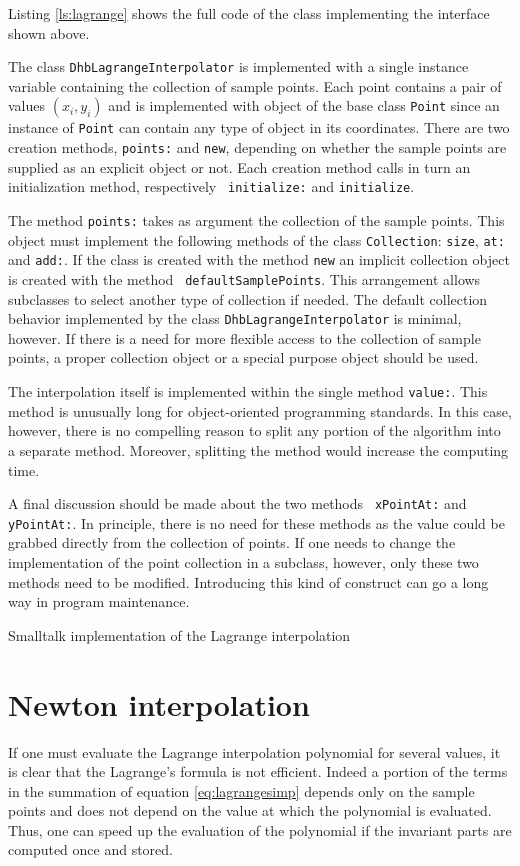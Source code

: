 \documentclass[twoside]{book}
\begin{document}
Listing \ref{ls:lagrange} shows the full code of the class
implementing the interface shown above.

The class {\tt DhbLagrangeInterpolator} is implemented with a
single instance variable containing the collection of sample
points. Each point contains a pair of values
$\left(x_i,y_i\right)$ and is implemented with object of the base
class {\tt Point} since an instance of {\tt Point} can contain any
type of object in its coordinates. There are two creation methods,
{\tt points:} and {\tt new}, depending on whether the sample
points are supplied as an explicit object or not. Each creation
method calls in turn an initialization method, respectively {\tt
initialize:} and {\tt initialize}.

The method {\tt points:} takes as argument the collection of the
sample points. This object must implement the following methods of
the class {\tt Collection}: {\tt size}, {\tt at:} and {\tt add:}.
If the class is created with the method {\tt new} an implicit
collection object is created with the method {\tt
defaultSamplePoints}. This arrangement allows subclasses to select
another type of collection if needed. The default collection
behavior implemented by the class {\tt DhbLagrangeInterpolator} is
minimal, however. If there is a need for more flexible access to
the collection of sample points, a proper collection object or a
special purpose object should be used.

The interpolation itself is implemented within the single method
{\tt value:}. This method is unusually long for object-oriented
programming standards. In this case, however, there is no
compelling reason to split any portion of the algorithm into a
separate method. Moreover, splitting the method would increase the
computing time.

A final discussion should be made about the two methods {\tt
xPointAt:} and {\tt yPointAt:}. In principle, there is no need for
these methods as the value could be grabbed directly from the
collection of points. If one needs to change the implementation of
the point collection in a subclass, however, only these two
methods need to be modified. Introducing this kind of construct
can go a long way in program maintenance.
\begin{listing}
Smalltalk implementation of the Lagrange interpolation
\label{ls:lagrange}

\end{listing}

\section{Newton interpolation}
\label{sec:newtoninterpol} If one must evaluate the Lagrange
interpolation polynomial for several values, it is clear that the
Lagrange's formula is not efficient. Indeed a portion of the terms
in the summation of equation \ref{eq:lagrangesimp} depends only on
the sample points and does not depend on the value at which the
polynomial is evaluated. Thus, one can speed up the evaluation of
the polynomial if the invariant parts are computed once and
stored.
\end{document}
